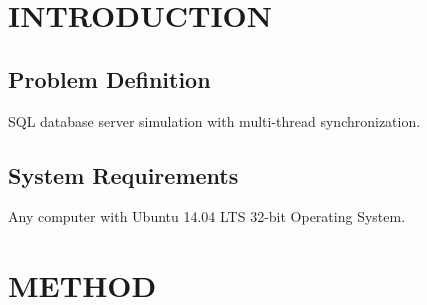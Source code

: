 \documentclass[12pt]{article}
\begin{document}
\vspace{\baselineskip}

\vspace{\baselineskip}

\vspace{\baselineskip}

\vspace{\baselineskip}

\vspace{\baselineskip}

\vspace{\baselineskip}

\vspace{\baselineskip}

\vspace{\baselineskip}

\vspace{\baselineskip}

\vspace{\baselineskip}

\vspace{\baselineskip}

\vspace{\baselineskip}

\vspace{\baselineskip}

\vspace{\baselineskip}

\vspace{\baselineskip}
\section{INTRODUCTION}
\subsection{Problem Definition }
\begin{justify}
SQL database server simulation with multi-thread synchronization.
\end{justify}
\subsection{System Requirements}

\vspace{\baselineskip}
\begin{justify}
Any computer with Ubuntu 14.04 LTS 32-bit Operating System.
\end{justify}
\section{METHOD}
\end{document}
